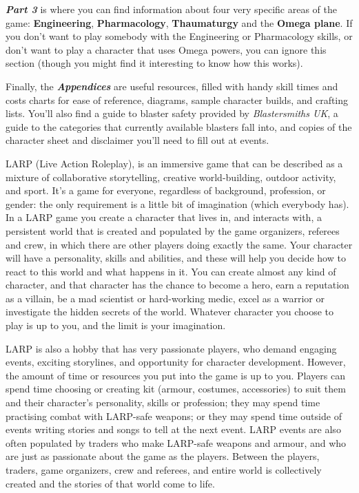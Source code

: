 \textbf{\textit{Part 3}} is where you can find information about four very specific areas of the game: \textbf{Engineering}, \textbf{Pharmacology}, \textbf{Thaumaturgy} and the \textbf{Omega plane}. If you don't want to play somebody with the Engineering or Pharmacology skills, or don't want to play a character that uses Omega powers, you can ignore this section (though you might find it interesting to know how this works).

Finally, the \textbf{\textit{Appendices}} are useful resources, filled with handy skill times and costs charts for ease of reference, diagrams, sample character builds, and crafting lists. You'll also find a guide to blaster safety provided by \textit{Blastersmiths UK}, a guide to the categories that currently available blasters fall into, and copies of the character sheet and disclaimer you'll need to fill out at events.

LARP (Live Action Roleplay), is an immersive game that can be described as a mixture of collaborative storytelling, creative world-building, outdoor activity, and sport. It's a game for everyone, regardless of background, profession, or gender: the only requirement is a little bit of imagination (which everybody has). In a LARP game you create a character that lives in, and interacts with, a persistent world that is created and populated by the game organizers, referees and crew, in which there are other players doing exactly the same. Your character will have a personality, skills and abilities, and these will help you decide how to react to this world and what happens in it. You can create almost any kind of character, and that character has the chance to become a hero, earn a reputation as a villain, be a mad scientist or hard-working medic, excel as a warrior or investigate the hidden secrets of the world. Whatever character you choose to play is up to you, and the limit is your imagination.

LARP is also a hobby that has very passionate players, who demand engaging events, exciting storylines, and opportunity for character development. However, the amount of time or resources you put into the game is up to you. Players can spend time choosing or creating kit (armour, costumes, accessories) to suit them and their character's personality, skills or profession; they may spend time practising combat with LARP-safe weapons; or they may spend time outside of events writing stories and songs to tell at the next event. LARP events are also often populated by traders who make LARP-safe weapons and armour, and who are just as passionate about the game as the players. Between the players, traders, game organizers, crew and referees, and entire world is collectively created and the stories of that world come to life.

